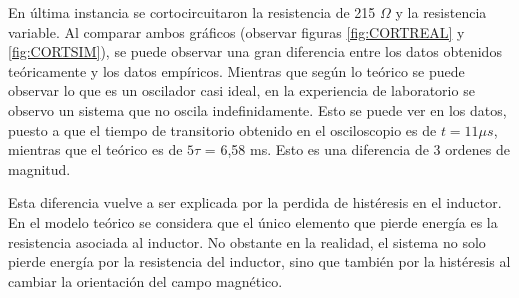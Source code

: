 \documentclass{article}
\begin{document}
  En última instancia se cortocircuitaron la resistencia de 215 $\Omega$ y la resistencia variable. Al comparar ambos gráficos (observar figuras \ref{fig:CORTREAL} y \ref{fig:CORTSIM}), se puede observar una gran diferencia entre los datos obtenidos teóricamente y los datos empíricos. Mientras que según lo teórico se puede observar lo que es un oscilador casi ideal, en la experiencia de laboratorio se observo un sistema que no oscila indefinidamente. Esto se puede ver en los datos, puesto a que el tiempo de transitorio obtenido en el osciloscopio es de $ t = 11 \mu s$, mientras que el teórico es de $5\tau$ = 6,58 ms. Esto es una diferencia de 3 ordenes de magnitud.\par
  Esta diferencia vuelve a ser explicada por la perdida de histéresis en el inductor. En el modelo teórico se considera que el único elemento que pierde energía es la resistencia asociada al inductor. No obstante en la realidad, el sistema no solo pierde energía por la resistencia del inductor, sino que también por la histéresis al cambiar la orientación del campo magnético.
  
\end{document}
